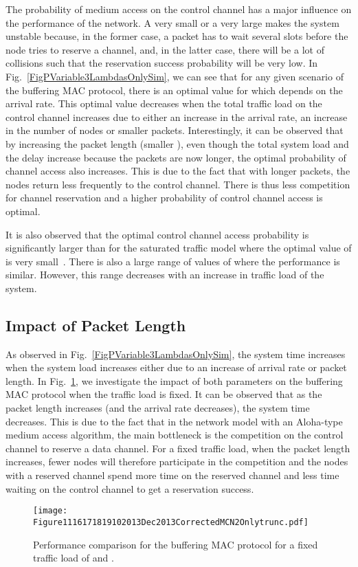 \documentclass[12pt,journal,oneside,onecolumn]{IEEEtran}
\begin{document}
The probability of medium access on the control channel 
has a major influence on the performance of the network. 
A very small  or a very large  makes the system 
unstable because, in the former case, a packet has to 
wait several slots before the node tries to reserve a channel, 
and, in the latter case, there will be a lot of collisions such that the reservation success probability
will be very low. In Fig.~\ref{FigPVariable3LambdasOnlySim}, 
we can see that for any given scenario of the buffering MAC protocol, there is an optimal value for  which depends
on the arrival rate. 
This optimal value decreases when the total traffic load on the control channel increases due
to either an increase in the arrival rate, an increase in the number of nodes or smaller packets.
Interestingly, it can be observed that by increasing the packet length (smaller ), 
even though the total system load and the delay increase because the packets are now longer, 
the optimal probability of channel access  also increases. 
This is due to the fact that with longer packets, the nodes return less frequently to the control channel. There
is thus less competition for channel reservation and a higher probability of control channel access is optimal. 

It is also observed that the optimal control channel access probability is significantly
larger than for the saturated traffic model where the optimal value of  is very small~\cite{pawelczak09}. There is also
a large range of values of  where the performance is similar. However, this range decreases with an increase in traffic load of the system.


\subsection{Impact of Packet Length}


As observed in Fig.~\ref{FigPVariable3LambdasOnlySim}, the system time increases when
the system load increases either due to an increase of arrival rate or packet length.
In  Fig.~\ref{Figure1116171819102013}, we investigate the impact of both parameters on the buffering MAC protocol when the traffic load
 is fixed. It can be observed that as the packet length increases (and the arrival rate decreases),
the system time decreases. This is due to the fact that in the network model with an Aloha-type medium access algorithm,
the main bottleneck is the competition on the control channel to reserve a data channel. 
For a fixed traffic load, when the packet length increases, 
fewer nodes will therefore participate in the competition and the nodes with a reserved channel 
spend more time on the reserved channel and less time waiting on the control channel to get a reservation success.
\begin{figure}\texttt{[image: Figure1116171819102013Dec2013CorrectedMCN2Onlytrunc.pdf]}\caption{Performance comparison for the buffering MAC protocol for a fixed traffic load of  and .}\label{Figure1116171819102013}\end{figure}
\end{document}
